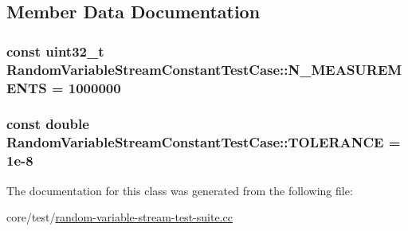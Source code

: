\subsection{Member Data Documentation}
\subsubsection[{\texorpdfstring{N\+\_\+\+M\+E\+A\+S\+U\+R\+E\+M\+E\+N\+TS}{N_MEASUREMENTS}}]{\setlength{\rightskip}{0pt plus 5cm}const uint32\+\_\+t Random\+Variable\+Stream\+Constant\+Test\+Case\+::\+N\+\_\+\+M\+E\+A\+S\+U\+R\+E\+M\+E\+N\+TS = 1000000\hspace{0.3cm}{\ttfamily [static]}}\hypertarget{classRandomVariableStreamConstantTestCase_a0aef4480cc0cfb05d42b5cac17414297}{}\label{classRandomVariableStreamConstantTestCase_a0aef4480cc0cfb05d42b5cac17414297}
\subsubsection[{\texorpdfstring{T\+O\+L\+E\+R\+A\+N\+CE}{TOLERANCE}}]{\setlength{\rightskip}{0pt plus 5cm}const double Random\+Variable\+Stream\+Constant\+Test\+Case\+::\+T\+O\+L\+E\+R\+A\+N\+CE = 1e-\/8\hspace{0.3cm}{\ttfamily [static]}}\hypertarget{classRandomVariableStreamConstantTestCase_ad76975f181825a0da363ca9e7a2bf2ef}{}\label{classRandomVariableStreamConstantTestCase_ad76975f181825a0da363ca9e7a2bf2ef}


The documentation for this class was generated from the following file\+:\begin{DoxyCompactItemize}
\item 
core/test/\hyperlink{random-variable-stream-test-suite_8cc}{random-\/variable-\/stream-\/test-\/suite.\+cc}\end{DoxyCompactItemize}
